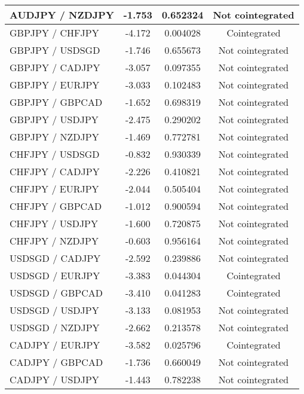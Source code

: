 \documentclass{article}
\begin{document}
\begin{table}[h!]
\begin{tabular}{|l|c|c|c|}
        \hline
        AUDJPY / NZDJPY & -1.753 & 0.652324 & Not cointegrated \\
        \hline
        GBPJPY / CHFJPY & -4.172 & 0.004028 & Cointegrated \\
        \hline
        GBPJPY / USDSGD & -1.746 & 0.655673 & Not cointegrated \\
        \hline
        GBPJPY / CADJPY & -3.057 & 0.097355 & Not cointegrated \\
        \hline
        GBPJPY / EURJPY & -3.033 & 0.102483 & Not cointegrated \\
        \hline
        GBPJPY / GBPCAD & -1.652 & 0.698319 & Not cointegrated \\
        \hline
        GBPJPY / USDJPY & -2.475 & 0.290202 & Not cointegrated \\
        \hline
        GBPJPY / NZDJPY & -1.469 & 0.772781 & Not cointegrated \\
        \hline
        CHFJPY / USDSGD & -0.832 & 0.930339 & Not cointegrated \\
        \hline
        CHFJPY / CADJPY & -2.226 & 0.410821 & Not cointegrated \\
        \hline
        CHFJPY / EURJPY & -2.044 & 0.505404 & Not cointegrated \\
        \hline
        CHFJPY / GBPCAD & -1.012 & 0.900594 & Not cointegrated \\
        \hline
        CHFJPY / USDJPY & -1.600 & 0.720875 & Not cointegrated \\
        \hline
        CHFJPY / NZDJPY & -0.603 & 0.956164 & Not cointegrated \\
        \hline
        USDSGD / CADJPY & -2.592 & 0.239886 & Not cointegrated \\
        \hline
        USDSGD / EURJPY & -3.383 & 0.044304 & Cointegrated \\
        \hline
        USDSGD / GBPCAD & -3.410 & 0.041283 & Cointegrated \\
        \hline
        USDSGD / USDJPY & -3.133 & 0.081953 & Not cointegrated \\
        \hline
        USDSGD / NZDJPY & -2.662 & 0.213578 & Not cointegrated \\
        \hline
        CADJPY / EURJPY & -3.582 & 0.025796 & Cointegrated \\
        \hline
        CADJPY / GBPCAD & -1.736 & 0.660049 & Not cointegrated \\
        \hline
        CADJPY / USDJPY & -1.443 & 0.782238 & Not cointegrated \\

\end{tabular}
\end{table}
\end{document}
